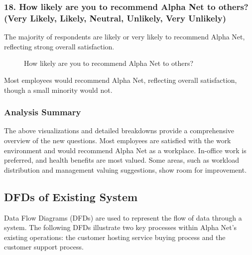 \subsubsection*{18. How likely are you to recommend Alpha Net to others? (Very Likely, Likely, Neutral, Unlikely, Very Unlikely)}

The majority of respondents are likely or very likely to recommend Alpha Net, reflecting strong overall satisfaction.

\begin{figure}[H]
    \centering
    \caption{How likely are you to recommend Alpha Net to others?}
    \label{fig:recommend_likelihood}
\end{figure}

Most employees would recommend Alpha Net, reflecting overall satisfaction, though a small minority would not.

\subsubsection*{Analysis Summary}

The above visualizations and detailed breakdowns provide a comprehensive overview of the new questions. Most employees are satisfied with the work environment and would recommend Alpha Net as a workplace. In-office work is preferred, and health benefits are most valued. Some areas, such as workload distribution and management valuing suggestions, show room for improvement.

\subsection{DFDs of Existing System}
Data Flow Diagrams (DFDs) are used to represent the flow of data through a system. The following DFDs illustrate two key processes within Alpha Net's existing operations: the customer hosting service buying process and the customer support process.

